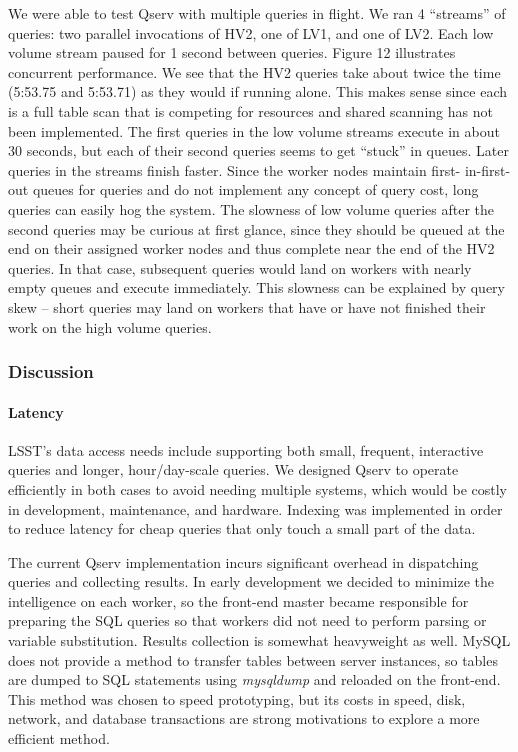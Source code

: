 \documentclass[DM,lsstdraft,toc]{lsstdoc}
\begin{document}
We were able to test Qserv with multiple queries in flight. We ran 4
``streams'' of queries: two parallel invocations of HV2, one of LV1, and
one of LV2. Each low volume stream paused for 1 second between queries.
Figure 12 illustrates concurrent performance. We see that the HV2
queries take about twice the time (5:53.75 and 5:53.71) as they would if
running alone. This makes sense since each is a full table scan that is
competing for resources and shared scanning has not been implemented.
The first queries in the low volume streams execute in about 30 seconds,
but each of their second queries seems to get ``stuck'' in queues. Later
queries in the streams finish faster. Since the worker nodes maintain
first- in-first-out queues for queries and do not implement any concept
of query cost, long queries can easily hog the system. The slowness of
low volume queries after the second queries may be curious at first
glance, since they should be queued at the end on their assigned worker
nodes and thus complete near the end of the HV2 queries. In that case,
subsequent queries would land on workers with nearly empty queues and
execute immediately. This slowness can be explained by query skew --
short queries may land on workers that have or have not finished their
work on the high volume queries.

\subsubsection{Discussion}\label{discussion-1}

\paragraph{Latency}\label{latency}

LSST's data access needs include supporting both small, frequent,
interactive queries and longer, hour/day-scale queries. We designed
Qserv to operate efficiently in both cases to avoid needing multiple
systems, which would be costly in development, maintenance, and
hardware. Indexing was implemented in order to reduce latency for cheap
queries that only touch a small part of the data.

The current Qserv implementation incurs significant overhead in
dispatching queries and collecting results. In early development we
decided to minimize the intelligence on each worker, so the front-end
master became responsible for preparing the SQL queries so that workers
did not need to perform parsing or variable substitution. Results
collection is somewhat heavyweight as well. MySQL does not provide a
method to transfer tables between server instances, so tables are dumped
to SQL statements using \emph{mysqldump} and reloaded on the front-end.
This method was chosen to speed prototyping, but its costs in speed,
disk, network, and database transactions are strong motivations to
explore a more efficient method.
\end{document}
